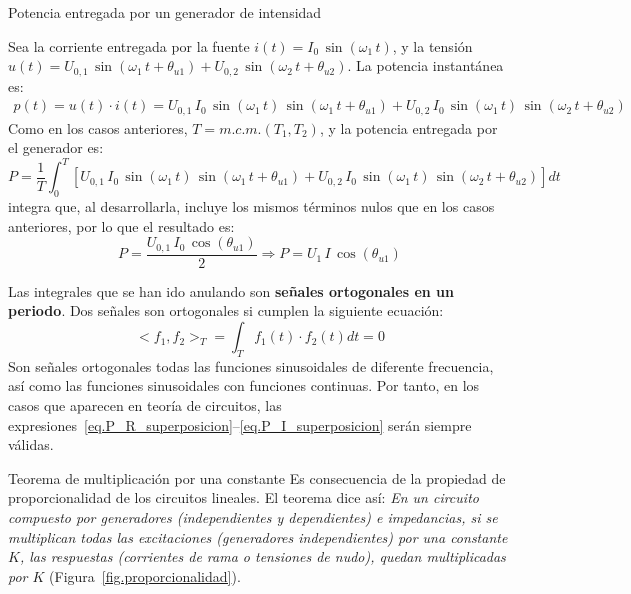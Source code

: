 \documentclass[11pt]{book} %
\makeatletter
\numberwithin{dummy}{section}
\theoremstyle{ocrenumbox}
\theoremstyle{blacknumex}
\theoremstyle{blacknumbox}
\theoremstyle{ocrenum}
\newenvironment{remark}{\par\vspace{10pt}\small %
\begin{list}{}{
\leftmargin=35pt %
\rightmargin=25pt}\item\ignorespaces %
\makebox[-2.5pt]{\begin{tikzpicture}[overlay]
\node[draw=ocre!60,line width=1pt,circle,fill=ocre!25,font=\sffamily\bfseries,inner sep=2pt,outer sep=0pt] at (-15pt,0pt){\textcolor{ocre}{N}};\end{tikzpicture}} %
\advance\baselineskip -1pt}{\end{list}\vskip5pt} %
\renewcommand{\subsection}{\@startsection {subsection}{2}{\z@}
{-3ex \@plus -0.1ex \@minus -.4ex}
{0.5ex \@plus.2ex }
{\normalfont\sffamily\bfseries}}
\renewcommand{\subsubsection}{\@startsection {subsubsection}{3}{\z@}
{-2ex \@plus -0.1ex \@minus -.2ex}
{.2ex \@plus.2ex }
{\normalfont\small\sffamily\bfseries}}
\newlength\esp
\makeatother
\begin{document}
\subsubsection{Potencia entregada por un generador de intensidad}

Sea la corriente entregada por la fuente $i(t)=I_0\,\sin(\omega_1\,t)$, y la tensión $u(t)=U_{0,1}\,\sin(\omega_1\,t+\theta_{u1})+U_{0,2}\,\sin(\omega_2\,t+\theta_{u2})$. La potencia instantánea es: 
\begin{align*}
  p(t) = u(t)\cdot i(t) = U_{0,1}\, I_{0}\,\sin(\omega_1\,t)\,\sin(\omega_1\,t+\theta_{u1}) + U_{0,2}\, I_{0}\,\sin(\omega_1\,t)\,\sin(\omega_2\,t+\theta_{u2})
\end{align*} 
Como en los casos anteriores, $T=m.c.m.(T_1,T_2)$, y la potencia entregada por el generador es: 
\begin{equation*}
    P=\dfrac{1}{T}\int_0^T \left[U_{0,1}\, I_{0}\,\sin(\omega_1\,t)\,\sin(\omega_1\,t+\theta_{u1})+U_{0,2}\, I_{0}\,\sin(\omega_1\,t)\,\sin(\omega_2\,t+\theta_{u2}) \right] dt
\end{equation*}
integra que, al desarrollarla, incluye los mismos términos nulos que en los casos anteriores, por lo que el resultado es: 
\begin{equation}\label{eq.P_I_superposicion}
    P=\dfrac{U_{0,1}\,I_0\,\cos(\theta_{u1})}{2}\Rightarrow \boxed{P=U_1\,I\,\cos(\theta_{u1})}
\end{equation}
    
\begin{remark}
    Las integrales que se han ido anulando son \textbf{señales ortogonales en un periodo}. Dos señales son ortogonales si cumplen la siguiente ecuación: 
\begin{equation*}
    <f_1, f_2>_T = \int_T f_1(t) \cdot f_2(t) dt = 0
\end{equation*}
Son señales ortogonales todas las funciones sinusoidales de diferente frecuencia, así como las funciones sinusoidales con funciones continuas. Por tanto, en los casos que aparecen en teoría de circuitos, las expresiones~\eqref{eq.P_R_superposicion}--\eqref{eq.P_I_superposicion} serán siempre válidas. 
\end{remark}

\subsection{Teorema de multiplicación por una constante}
Es consecuencia de la propiedad de proporcionalidad de los circuitos lineales. El teorema dice así: \textit{En un circuito compuesto por generadores (independientes y dependientes) e impedancias, si se multiplican todas las excitaciones (generadores independientes) por una constante $K$, las respuestas (corrientes de rama o tensiones de nudo), quedan multiplicadas por $K$} (Figura~\ref{fig.proporcionalidad}).
\end{document}

